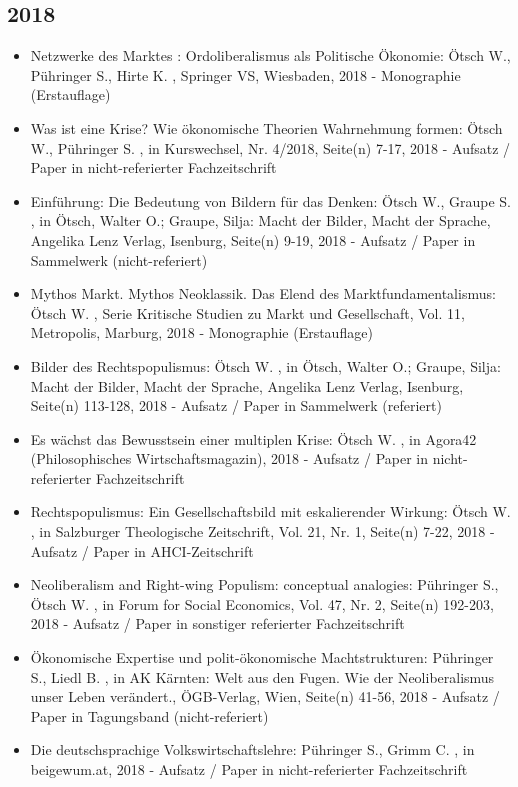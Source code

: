  \subsection{2018} 
 \begin{itemize} 
	 \item Netzwerke des Marktes : Ordoliberalismus als Politische Ökonomie: Ötsch W., Pühringer S., Hirte K. , Springer VS, Wiesbaden, 2018 - Monographie (Erstauflage)
	 \item Was ist eine Krise? Wie ökonomische Theorien Wahrnehmung formen: Ötsch W., Pühringer S. , in Kurswechsel, Nr. 4/2018, Seite(n) 7-17, 2018 - Aufsatz / Paper in nicht-referierter Fachzeitschrift
	 \item Einführung: Die Bedeutung von Bildern für das Denken: Ötsch W., Graupe S. , in Ötsch, Walter O.; Graupe, Silja: Macht der Bilder, Macht der Sprache, Angelika Lenz Verlag, Isenburg, Seite(n) 9-19, 2018 - Aufsatz / Paper in Sammelwerk (nicht-referiert)
	 \item Mythos Markt. Mythos Neoklassik. Das Elend des Marktfundamentalismus: Ötsch W. , Serie Kritische Studien zu Markt und Gesellschaft, Vol. 11, Metropolis, Marburg, 2018 - Monographie (Erstauflage)
	 \item Bilder des Rechtspopulismus: Ötsch W. , in Ötsch, Walter O.; Graupe, Silja: Macht der Bilder, Macht der Sprache, Angelika Lenz Verlag, Isenburg, Seite(n) 113-128, 2018 - Aufsatz / Paper in Sammelwerk (referiert)
	 \item Es wächst das Bewusstsein einer multiplen Krise: Ötsch W. , in Agora42 (Philosophisches Wirtschaftsmagazin), 2018 - Aufsatz / Paper in nicht-referierter Fachzeitschrift
	 \item Rechtspopulismus: Ein Gesellschaftsbild mit eskalierender Wirkung: Ötsch W. , in Salzburger Theologische Zeitschrift, Vol. 21, Nr. 1, Seite(n) 7-22, 2018 - Aufsatz / Paper in AHCI-Zeitschrift
	 \item Neoliberalism and Right-wing Populism: conceptual analogies: Pühringer S., Ötsch W. , in Forum for Social Economics, Vol. 47, Nr. 2, Seite(n) 192-203, 2018 - Aufsatz / Paper in sonstiger referierter Fachzeitschrift
	 \item Ökonomische Expertise und polit-ökonomische Machtstrukturen: Pühringer S., Liedl B. , in AK Kärnten: Welt aus den Fugen. Wie der Neoliberalismus unser Leben verändert., ÖGB-Verlag, Wien, Seite(n) 41-56, 2018 - Aufsatz / Paper in Tagungsband (nicht-referiert)
	 \item Die deutschsprachige Volkswirtschaftslehre: Pühringer S., Grimm C. , in beigewum.at, 2018 - Aufsatz / Paper in nicht-referierter Fachzeitschrift

\end{itemize}
